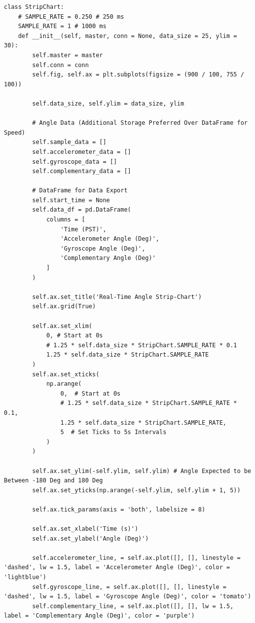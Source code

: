 \documentclass{article}
\begin{document}
\begin{lstlisting}[caption={Source Code : Python Stripchart}, label={lst:stripchart_code}]
    class StripChart:
    # SAMPLE_RATE = 0.250 # 250 ms
    SAMPLE_RATE = 1 # 1000 ms
    def __init__(self, master, conn = None, data_size = 25, ylim = 30):
        self.master = master
        self.conn = conn
        self.fig, self.ax = plt.subplots(figsize = (900 / 100, 755 / 100))

        self.data_size, self.ylim = data_size, ylim

        # Angle Data (Additional Storage Preferred Over DataFrame for Speed)
        self.sample_data = []
        self.accelerometer_data = []
        self.gyroscope_data = []
        self.complementary_data = []

        # DataFrame for Data Export
        self.start_time = None
        self.data_df = pd.DataFrame(
            columns = [
                'Time (PST)',
                'Accelerometer Angle (Deg)',
                'Gyroscope Angle (Deg)',
                'Complementary Angle (Deg)'
            ]
        )

        self.ax.set_title('Real-Time Angle Strip-Chart')
        self.ax.grid(True)

        self.ax.set_xlim(
            0, # Start at 0s
            # 1.25 * self.data_size * StripChart.SAMPLE_RATE * 0.1
            1.25 * self.data_size * StripChart.SAMPLE_RATE
        )
        self.ax.set_xticks(
            np.arange(
                0,  # Start at 0s
                # 1.25 * self.data_size * StripChart.SAMPLE_RATE * 0.1,
                1.25 * self.data_size * StripChart.SAMPLE_RATE,
                5  # Set Ticks to 5s Intervals
            )
        )

        self.ax.set_ylim(-self.ylim, self.ylim) # Angle Expected to be Between -180 Deg and 180 Deg
        self.ax.set_yticks(np.arange(-self.ylim, self.ylim + 1, 5))

        self.ax.tick_params(axis = 'both', labelsize = 8)

        self.ax.set_xlabel('Time (s)')
        self.ax.set_ylabel('Angle (Deg)')

        self.accelerometer_line, = self.ax.plot([], [], linestyle = 'dashed', lw = 1.5, label = 'Accelerometer Angle (Deg)', color = 'lightblue')
        self.gyroscope_line, = self.ax.plot([], [], linestyle = 'dashed', lw = 1.5, label = 'Gyroscope Angle (Deg)', color = 'tomato')
        self.complementary_line, = self.ax.plot([], [], lw = 1.5, label = 'Complementary Angle (Deg)', color = 'purple')


\end{lstlisting}
\end{document}
